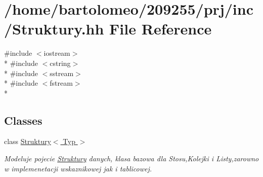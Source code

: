 \hypertarget{_struktury_8hh}{\section{/home/bartolomeo/209255/prj/inc/\-Struktury.hh File Reference}
\label{_struktury_8hh}
}
{\ttfamily \#include $<$iostream$>$}\\*
{\ttfamily \#include $<$cstring$>$}\\*
{\ttfamily \#include $<$sstream$>$}\\*
{\ttfamily \#include $<$fstream$>$}\\*
\subsection*{Classes}
\begin{DoxyCompactItemize}
\item 
class \hyperlink{class_struktury}{Struktury$<$ Typ $>$}
\begin{DoxyCompactList}\small\item\em Modeluje pojecie \hyperlink{class_struktury}{Struktury} danych, klasa bazowa dla Stosu,Kolejki i Listy,zarowno w implemenetacji wskaznikowej jak i tablicowej. \end{DoxyCompactList}\end{DoxyCompactItemize}
